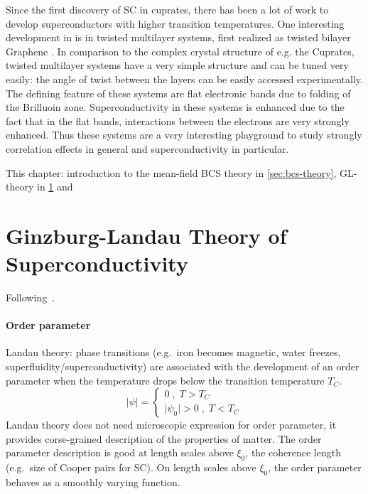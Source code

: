 \documentclass[../notes.tex]{subfiles}
\begin{document}
Since the first discovery of SC in cuprates, there has been a lot of work to develop superconductors with higher transition temperatures.
One interesting development in is in twisted multilayer systems, first realized as twisted bilayer Graphene \cite{caoUnconventionalSuperconductivityMagicangle2018}.
In comparison to the complex crystal structure of e.g. the Cuprates, twisted multilayer systems have a very simple structure and can be tuned very easily: the angle of twist between the layers can be easily accessed experimentally.
The defining feature of these systems are flat electronic bands due to folding of the Brilluoin zone.
Superconductivity in these systems is enhanced due to the fact that in the flat bands, interactions between the electrons are very strongly enhanced.
Thus these systems are a very interesting playground to study strongly correlation effects in general and superconductivity in particular.

This chapter: introduction to the mean-field BCS theory in \cref{sec:bcs-theory}, GL-theory in \cref{sec:Ginzburg-Landau theory of superconductivity} and


\section{Ginzburg-Landau Theory of Superconductivity}\label{sec:Ginzburg-Landau theory of superconductivity}

Following~\cite[ch. 11]{colemanIntroductionManyBodyPhysics2015}.

\paragraph{Order parameter}

Landau theory: phase transitions (e.g.\ iron becomes magnetic, water freezes, superfluidity/superconductivity) are associated with the development of an order parameter when the temperature drops below the transition temperature \(T_C\).
\begin{equation}
	\vert \psi \vert =
	\begin{cases}
		0\;,\; T > T_C \\
		\vert \psi_0 \vert > 0 \;,\; T < T_C
	\end{cases}
\end{equation}
Landau theory does not need microscopic expression for order parameter, it provides corse-grained description of the properties of matter.
The order parameter description is good at length scales above \(\xi_0\), the coherence length (e.g.\ size of Cooper pairs for SC).
On length scales above \(\xi_0\), the order parameter behaves as a smoothly varying function.
\end{document}
